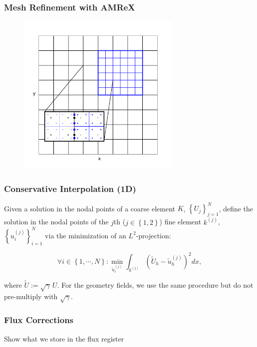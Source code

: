 \documentclass{beamer}
\begin{document}
\begin{frame}
\frametitle{Mesh Refinement with AMReX}

  \begin{figure}[htb!]
    \centering
    \includegraphics[width=0.7\textwidth]{fig.MeshRefinement_2D.png}
  \end{figure}

\end{frame}

\begin{frame}
\frametitle{Conservative Interpolation (1D)}

  Given a solution in the nodal points of a coarse element $K$,
  $\left\{U_{j}\right\}_{j=1}^{N}$,
  define the solution in the nodal points of the $j$th
  ($j\in\left\{1,2\right\}$)
  fine element $k^{\left(j\right)}$,
  $\left\{u_{i}^{\left(j\right)}\right\}_{i=1}^{N}$
  via the minimization of an $L^{2}$-projection:

  $$\forall i \in \left\{1,\cdots,N\right\}:
  \min\limits_{\tilde{u}_{i}^{\left(j\right)}}
  \int_{k^{\left(j\right)}}\left(\tilde{U}_{h}
  -\tilde{u}_{h}^{\left(j\right)}\right)^{2}dx,$$

  where $\tilde{U} := \sqrt{\gamma} \, U$.
  For the geometry fields, we use the same procedure but do not pre-multiply
  with $\sqrt{\gamma}$.

\end{frame}

\begin{frame}
\frametitle{Flux Corrections}

Show what we store in the flux register

\end{frame}
\end{document}
